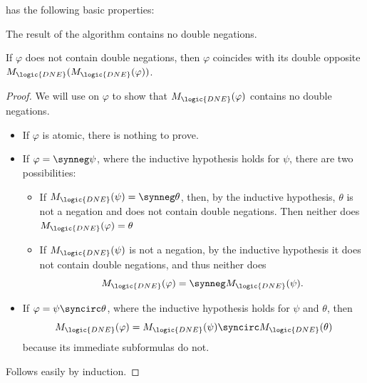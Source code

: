 \begin{proposition}\label{thm:alg:propositional_repeated_negation_collapse}
   has the following basic properties:
  \begin{thmenum}
     The result of the algorithm contains no double negations.

     If \( \varphi \) does not contain double negations, then \( \varphi \) coincides with its double opposite \( M_{\logic{DNE}}(M_{\logic{DNE}}(\varphi)) \).
   \end{thmenum}
\end{proposition}
\begin{proof}
   We will use  on \( \varphi \) to show that \( M_{\logic{DNE}}(\varphi) \) contains no double negations.

  \begin{itemize}
    \item If \( \varphi \) is atomic, there is nothing to prove.
    \item If \( \varphi = \synneg \psi \), where the inductive hypothesis holds for \( \psi \), there are two possibilities:
    \begin{itemize}
      \item If \( M_{\logic{DNE}}(\psi) = \synneg \theta \), then, by the inductive hypothesis, \( \theta \) is not a negation and does not contain double negations. Then neither does \( M_{\logic{DNE}}(\varphi) = \theta \)

      \item If \( M_{\logic{DNE}}(\psi) \) is not a negation, by the inductive hypothesis it does not contain double negations, and thus neither does
      \begin{equation*}
        M_{\logic{DNE}}(\varphi) = \synneg M_{\logic{DNE}}(\psi).
      \end{equation*}
    \end{itemize}

    \item If \( \varphi = \psi \syncirc \theta \), where the inductive hypothesis holds for \( \psi \) and \( \theta \), then
    \begin{equation*}
      M_{\logic{DNE}}(\varphi) = M_{\logic{DNE}}(\psi) \syncirc M_{\logic{DNE}}(\theta)
    \end{equation*}
    because its immediate subformulas do not.
  \end{itemize}

   Follows easily by induction.
\end{proof}

